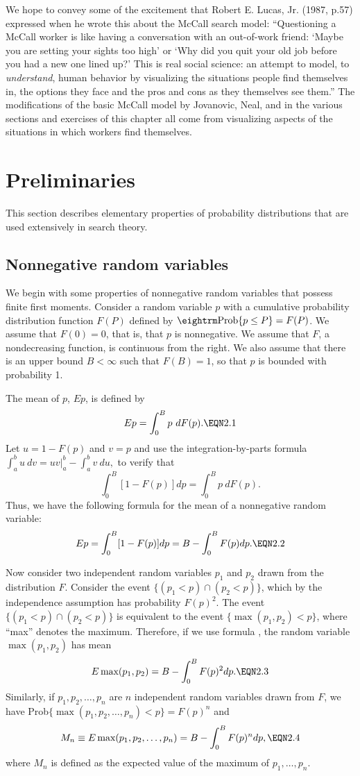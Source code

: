 We hope to convey some of the excitement that Robert E. Lucas, Jr. (1987, p.57)
expressed when he wrote this about the McCall search model:
``Questioning a McCall worker is like having a conversation with an out-of-work friend:
`Maybe you are setting your sights too high' or `Why did you quit your old job before
you had a new one lined up?' This is real social science: an attempt to model,
to {\it understand\/}, human behavior by visualizing the situations people find themselves in,
the options they face and the pros and cons as they themselves see them.'' The modifications
of the basic McCall model by Jovanovic, Neal, and in the various sections and exercises of this chapter all
come from visualizing  aspects of the situations in which workers find themselves.
\section{Preliminaries}

  This section describes elementary properties of probability distributions
that are used extensively in search theory.
\subsection{Nonnegative random variables}

We begin with some properties of nonnegative random variables that
possess finite first moments.  Consider a random variable $p$ with a cumulative
probability distribution function $F(P)$ defined by ${\rm Prob}\{p\le P\} =F(P)$.  We
assume that $F(0)=0$, that is, that $p$ is nonnegative.  We assume
that %
$F$, a nondecreasing function, is
continuous from the right.  We also assume that there is an
upper bound $B<\infty$ such that $F(B)=1$, so that $p$ is bounded with
probability 1.

The mean of $p$, $Ep$, is defined by
$$Ep=\int_0^B p\ dF(p).\EQN 2.1$$
Let $u=1-F(p)$ and $v=p$ and use the integration-by-parts formula
$\int_a^b u\ dv=uv \Big\vert_a^b -\int_a^b v\ du,$
to verify that
$$\int_0^B [1-F(p)]dp =\int_0^B p\ dF(p).$$
Thus, we have the following formula for the mean of a
nonnegative random variable:
$$Ep=\int_0^B [1-F(p)]dp = B - \int_0^B F(p)dp .\EQN 2.2$$

Now consider two independent random variables $p_1$ and $p_2$ drawn from the
distribution $F$.  Consider the event $\{(p_1<p)\cap (p_2<p)\}$, which by the
independence assumption has probability $F(p)^2$.  The event $\{(p_1<p)\cap
(p_2<p)\}$ is equivalent to the event $\{\max(p_1,p_2)<p\}$, where ``max''
denotes the maximum.  Therefore, if we use formula , the random
variable
$\max (p_1,p_2)$ has mean
$$E\max (p_1,p_2) = B - \int_0^B F(p)^2 dp %
.\EQN 2.3$$
Similarly, if $p_1,p_2,\ldots, p_n$ are $n$ independent random variables drawn
from $F$, we have Prob$\{\max(p_1,p_2,\ldots, p_n)<p\}=F(p)^n$ and
$$M_n\equiv E\max (p_1,p_2,\ldots, p_n) = B - \int_0^B F(p)^n
dp,\EQN 2.4$$
where $M_n$ is defined as the expected value of the maximum of
$p_1,\ldots,p_n$.

